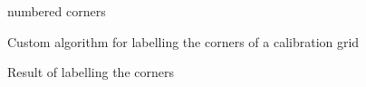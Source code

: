 \documentclass[12pt,a4paper,oneside,openright]{book}
\begin{document}
\begin{CJK}{UTF8}{}
\begin{figure}[htbp]
\begin{center}
\begin{minipage}[t]{.32\textwidth}
\begin{center}
        numbered corners
      \end{center}
    \end{minipage}
    \caption{Custom algorithm for labelling the corners of a calibration grid\label{fig:grid}}
  \end{center}
\end{figure}
\begin{figure}[htbp]
  \begin{center}
    \caption{Result of labelling the corners\label{fig:gridres}}
  \end{center}
\end{figure}


\end{CJK}
\end{document}
